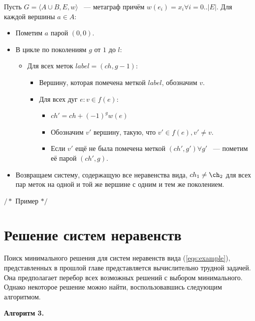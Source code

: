 \documentclass[14pt]{mmcs-article}
\begin{document}

Пусть $G = \langle A \cup B, E,w\rangle$ ~--- метаграф причём $w(e_i) = x_i \forall i = 0..|E|$. Для каждой вершины $a \in A:$

\begin{itemize}
    \item Пометим $a$ парой $(0, 0)$.
    \item В цикле по поколениям $g$ от $1$ до $l$:
      \begin{itemize}
      \item Для всех меток $label = (ch, g - 1)$:
        \begin{itemize}
        \item Вершину, которая помечена меткой $label$, обозначим $v$.
        \item Для всех дуг $e: v \in f(e)$:
          \begin{itemize}
          \item $ch' = ch + (-1)^{g} w(e)$
          \item Обозначим $v'$ вершину, такую, что $v' \in f(e), v' \neq v$.
          \item Если $v'$ ещё не была помечена меткой $(ch', g') \forall g'$ ~--- пометим её парой $(ch', g)$.
          \end{itemize}
        \end{itemize}
      \end{itemize}
    \item Возвращаем систему, содержащую все неравенства вида, $ch_1 \neq \ch_2$ для всех пар меток на одной и той же вершине с одним и тем же поколением.
\end{itemize}

$/*$ Пример $*/$

\section*{Решение систем неравенств}

Поиск минимального решения для систем неравенств вида (\ref{eqs:example}), представленных в прошлой главе представляется вычислительно трудной задачей. Она предполагает перебор всех возможных решений с выбором минимального. Однако некоторое решение можно найти, воспользовавшись следующим алгоритмом.

\textbf{Алгоритм 3.}
\end{document}
